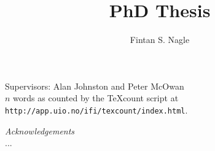 \documentclass[a4paper]{report}
\title{PhD Thesis}
\author{Fintan S. Nagle}
\begin{document}
\maketitle

\begin{center}
Supervisors: Alan Johnston and Peter McOwan
\\
$n$ words as counted by  the TeXcount script at \texttt{http://app.uio.no/ifi/texcount/index.html}.
\vspace{3cm}


\vspace{3cm}

\textit{Acknowledgements}\\
...
\end{center}


\pagebreak


\tableofcontents

\pagebreak








\begin{singlespace}
\begin{footnotesize}
\begin{twocolumn}


\end{twocolumn}
\end{footnotesize}
\end{singlespace}
\newpage


\end{document}

